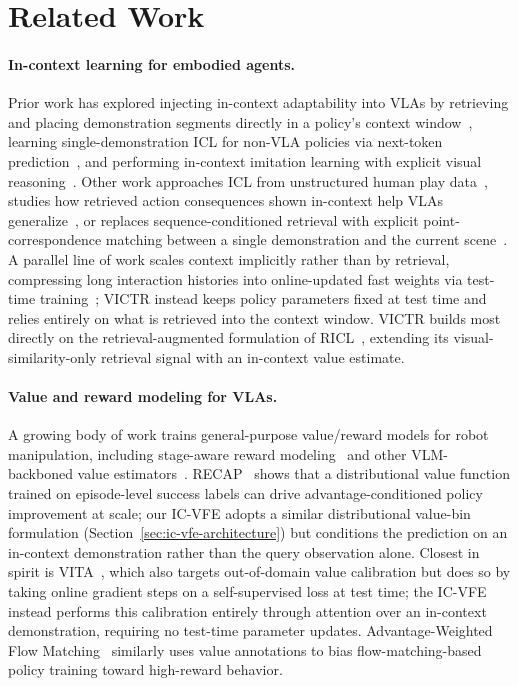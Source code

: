 \documentclass[conference]{IEEEtran}
\newcommand{\method}{VICTR\xspace}
\begin{document}
\section{Related Work}
\label{sec:related-work}

\paragraph{In-context learning for embodied agents.} Prior work has explored injecting in-context adaptability into VLAs by retrieving and placing demonstration segments directly in a policy's context window~\cite{ricl}, learning single-demonstration ICL for non-VLA policies via next-token prediction~\cite{icrt}, and performing in-context imitation learning with explicit visual reasoning~\cite{iclr}. 
Other work approaches ICL from unstructured human play data~\cite{mimicdroid}, studies how retrieved action consequences shown in-context help VLAs generalize~\cite{reflectivevla}, or replaces sequence-conditioned retrieval with explicit point-correspondence matching between a single demonstration and the current scene~\cite{matchingpolicy}. 
A parallel line of work scales context implicitly rather than by retrieval, compressing long interaction histories into online-updated fast weights via test-time training~\cite{robottt}; \method instead keeps policy parameters fixed at test time and relies entirely on what is retrieved into the context window.
\method builds most directly on the retrieval-augmented formulation of RICL~\cite{ricl}, extending its visual-similarity-only retrieval signal with an in-context value estimate.

\paragraph{Value and reward modeling for VLAs.} A growing body of work trains
general-purpose value/reward models for robot manipulation, including
stage-aware reward modeling~\cite{sarm} and other VLM-backboned value
estimators~\cite{robometer,topreward}. RECAP~\cite{pi06} shows that a
distributional value function trained on episode-level success labels can
drive advantage-conditioned policy improvement at scale; our IC-VFE adopts a
similar distributional value-bin formulation
(Section~\ref{sec:ic-vfe-architecture}) but conditions the prediction on an
in-context demonstration rather than the query observation alone. Closest in
spirit is VITA~\cite{vita}, which also targets out-of-domain value
calibration but does so by taking online gradient steps on a
self-supervised loss at test time; the IC-VFE instead performs this
calibration entirely through attention over an in-context demonstration,
requiring no test-time parameter updates.
Advantage-Weighted Flow Matching~\cite{awfm} similarly uses value annotations
to bias flow-matching-based policy training toward high-reward behavior.
\end{document}
